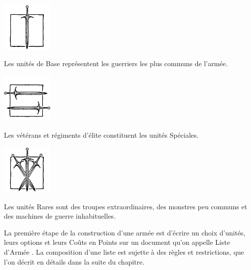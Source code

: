 \noindent\begin{minipage}[t]{0.3\textwidth}
\begin{center}\includegraphics[width=2.5cm]{../Layout/pics/logo_core.png}

Les unités de Base représentent les guerriers les plus communs de l'armée.
\end{center}
\end{minipage}\hfill
\begin{minipage}[t]{0.3\textwidth}
\begin{center}\includegraphics[width=2.5cm]{../Layout/pics/logo_special.png}

Les vétérans et régiments d'élite constituent les unités Spéciales.
\end{center}
\end{minipage}\hfill
\begin{minipage}[t]{0.3\textwidth}
\begin{center}\includegraphics[width=2.5cm]{../Layout/pics/logo_rare.png}

Les unités Rares sont des troupes extraordinaires, des monstres peu communs et des machines de guerre inhabituelles.
\end{center}
\end{minipage}

\vspace*{10pt}
La première étape de la construction d'une armée est d'écrire un choix d'unités, leurs options et leurs Coûts en Points sur un document qu'on appelle \og Liste d'Armée \fg{}. La composition d'une liste est sujette à des règles et restrictions, que l'on décrit en détails dans la suite du chapitre.

